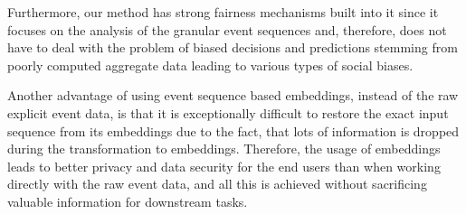 \documentclass{article}
\begin{document}
Furthermore, our method has strong fairness mechanisms built into it since it focuses on the analysis of the granular event sequences and, therefore, does not have to deal with the problem of biased decisions and predictions stemming from poorly computed aggregate data leading to various types of social biases.

Another advantage of using event sequence based embeddings, instead of the raw explicit event data, is that it is exceptionally difficult to restore the exact input sequence from its embeddings due to the fact, that lots of information is dropped during the transformation to embeddings. Therefore, the usage of embeddings leads to better privacy and data security for the end users than when working directly with the raw event data, and all this is achieved without sacrificing valuable information for downstream tasks.





\end{document}
